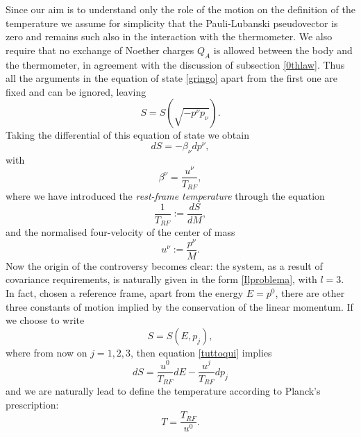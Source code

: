 \documentclass[twocolumn,usenatbib]{mnras2}
\begin{document}
Since our aim is to understand only the role of the motion on the definition of the temperature we assume for simplicity that the Pauli-Lubanski pseudovector is zero and remains such also in the interaction with the thermometer. We also require that no exchange of Noether charges $Q_A$ is allowed between the body and the thermometer, in agreement with the discussion of subsection \ref{0thlaw}. Thus all the arguments in the equation of state \eqref{gringo} apart from the first one are fixed and can be ignored, leaving
\begin{equation}\label{Quellabuona}
S=S(\sqrt{-p^\nu p_\nu}).
\end{equation}
Taking the differential of this equation of state we obtain
\begin{equation}\label{tuttoqui}
dS = -\beta_\nu dp^\nu,
\end{equation}
with
\begin{equation}\label{vnidfovkm}
\beta^\nu = \dfrac{u^\nu}{T_{RF}},
\end{equation}
where we have introduced the \textit{rest-frame temperature} through the equation
\begin{equation}\label{TRFFF}
\dfrac{1}{T_{RF}} := \dfrac{d S}{dM},
\end{equation}
and the normalised four-velocity of the center of mass
\begin{equation}
u^\nu := \dfrac{p^\nu}{M} .
\end{equation}
Now the origin of the controversy becomes clear: the system, as a result of covariance requirements, is naturally given in the form \eqref{Ilproblema}, with $l=3$. In fact, chosen a reference frame, apart from the energy $E=p^0$, there are other three constants of motion implied by the conservation of the linear momentum. If we choose to write 
\begin{equation}
S=S(E,p_j),
\end{equation}
where from now on $j=1,2,3$, then equation \eqref{tuttoqui} implies
\begin{equation}\label{zigtur}
dS = \dfrac{u^0}{T_{RF}} dE - \dfrac{u^j}{T_{RF}} dp_j
\end{equation}
and we are naturally lead to define the temperature according to Planck's prescription:
\begin{equation}\label{Planck}
T = \dfrac{T_{RF}}{u^0}.
\end{equation}
\end{document}
